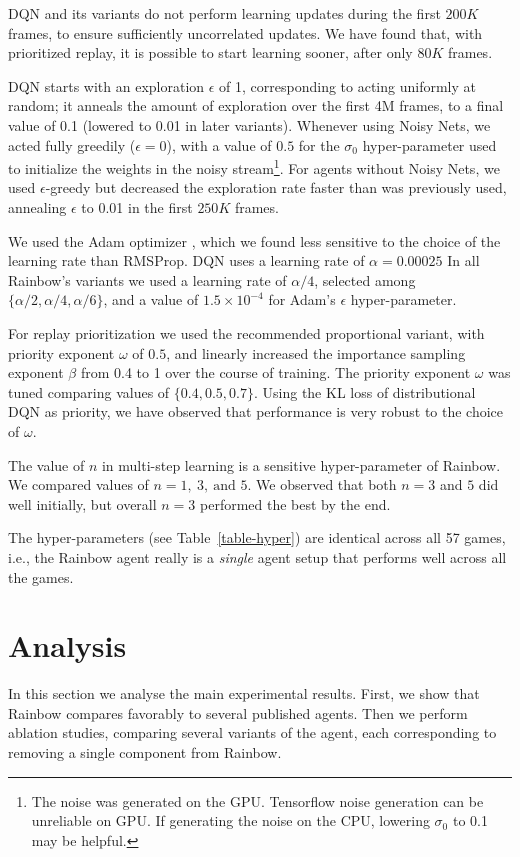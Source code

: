 \documentclass[letterpaper]{article} %
\begin{document}
DQN and its variants do not perform learning updates during the first $200K$ frames, to ensure sufficiently uncorrelated updates. We have found that, with prioritized replay, it is possible to start learning sooner, after only $80K$ frames. 

DQN starts with an exploration $\epsilon$ of 1, corresponding to acting uniformly at random; it anneals the amount of exploration over the first 4M frames, to a final value of 0.1 (lowered to 0.01 in later variants). Whenever using Noisy Nets, we acted fully greedily ($\epsilon=0$), with a value of $0.5$ for the $\sigma_0$ hyper-parameter used to initialize the weights in the noisy stream\footnote{The noise was generated on the GPU. Tensorflow noise generation can be unreliable on GPU. If generating the noise on the CPU, lowering $\sigma_0$ to 0.1 may be helpful.}.  For agents without Noisy Nets, we used $\epsilon$-greedy but decreased the exploration rate faster than was previously used, annealing $\epsilon$ to 0.01 in the first $250K$ frames.

We used the Adam optimizer \cite{kingma2014adam}, which we found less sensitive to the choice of the learning rate than RMSProp. DQN uses a learning rate of $\alpha = 0.00025$ In all Rainbow's variants we used a learning rate of $\alpha/4$, selected among $\{\alpha/2, \alpha/4, \alpha/6\}$, and a value of $1.5\times10^{-4}$ for Adam's $\epsilon$ hyper-parameter.

For replay prioritization we used the recommended proportional variant, with priority exponent $\omega$ of $0.5$, and linearly increased the importance sampling exponent $\beta$ from 0.4 to 1 over the course of training. The priority exponent $\omega$ was tuned comparing values of $\{0.4, 0.5, 0.7\}$. Using the KL loss of distributional DQN as priority, we have observed that performance is very robust to the choice of $\omega$.

The value of $n$ in multi-step learning is a sensitive hyper-parameter of Rainbow. We compared values of $n=1,\ 3,\ \text{and } 5$.  We observed that both $n=3$ and $5$ did well initially, but overall $n=3$ performed the best by the end. 

The hyper-parameters (see Table~\ref{table-hyper}) are identical across all 57 games, i.e., the Rainbow agent really is a \emph{single} agent setup that performs well across all the games.

\section{Analysis}
In this section we analyse the main experimental results. First, we show that Rainbow compares favorably to several published agents. Then we perform ablation studies, comparing several variants of the agent, each corresponding to removing a single component from Rainbow.
\end{document}
